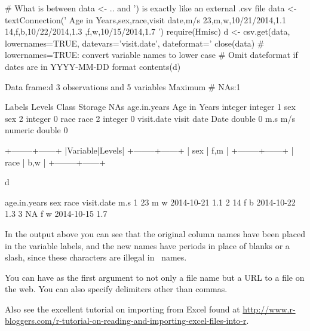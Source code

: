 \begin{Schunk}
\begin{Sinput}
# What is between data <- .. and ') is exactly like an external .csv file
data <- textConnection('
Age in Years,sex,race,visit date,m/s
23,m,w,10/21/2014,1.1
14,f,b,10/22/2014,1.3
,f,w,10/15/2014,1.7
')
require(Hmisc)
d <- csv.get(data, lowernames=TRUE, datevars='visit.date',
             dateformat='%
close(data)
# lowernames=TRUE: convert variable names to lower case
# Omit dateformat if dates are in YYYY-MM-DD format
contents(d)
\end{Sinput}
\begin{Soutput}

Data frame:d	3 observations and 5 variables    Maximum # NAs:1


                   Labels Levels   Class Storage NAs
age.in.years Age in Years        integer integer   1
sex                   sex      2         integer   0
race                 race      2         integer   0
visit.date     visit date           Date  double   0
m.s                   m/s        numeric  double   0

+--------+------+
|Variable|Levels|
+--------+------+
|  sex   |  f,m |
+--------+------+
|  race  |  b,w |
+--------+------+
\end{Soutput}
\begin{Sinput}
d
\end{Sinput}
\begin{Soutput}
  age.in.years sex race visit.date m.s
1           23   m    w 2014-10-21 1.1
2           14   f    b 2014-10-22 1.3
3           NA   f    w 2014-10-15 1.7
\end{Soutput}
\end{Schunk}
In the  output above you can see that the original column
names have been placed in the variable labels, and the new names have
periods in place of blanks or a slash, since these characters are
illegal in \R\ names.

You can have as the first argument to  not only a file
name but a URL to a file on the web.  You can also specify delimiters
other than commas.

Also see the excellent tutorial on importing from Excel found at \url{http://www.r-bloggers.com/r-tutorial-on-reading-and-importing-excel-files-into-r}.

